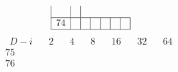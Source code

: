 \documentclass{article}
\begin{document}
{$$\begin{array}{|r|*{6}{r|}}
 & 
\\
\hline
74 
 & 
 & 
 & 
 & 
 & 
 & 
\\
\hline
\end{array}
$$
$$
\begin{array}{|r|*{6}{r|}}
\hline
\ \ D-i \ \ &\ \ 2\ \ &\ \ 4\ \ &\ \ 8\ \ &\ \ 16\ \ &\ \ 32\ \ &\ \ 64\ \ \\
\hline
75 
 & 
 & 
 & 
 & 
 & 
 & 
\\
\hline
76 
 & 

\end{array}$$}
\end{document}
